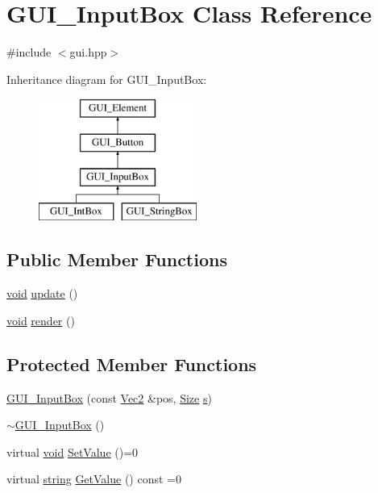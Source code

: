 \hypertarget{class_g_u_i___input_box}{\section{G\-U\-I\-\_\-\-Input\-Box Class Reference}
\label{class_g_u_i___input_box}
}


{\ttfamily \#include $<$gui.\-hpp$>$}

Inheritance diagram for G\-U\-I\-\_\-\-Input\-Box\-:\begin{figure}[H]
\begin{center}
\leavevmode
\includegraphics[height=4.000000cm]{class_g_u_i___input_box}
\end{center}
\end{figure}
\subsection*{Public Member Functions}
\begin{DoxyCompactItemize}
\item 
\hyperlink{_s_d_l__opengles2__gl2ext_8h_ae5d8fa23ad07c48bb609509eae494c95}{void} \hyperlink{class_g_u_i___input_box_a746bc2202307104665d4ab30ad995a7b}{update} ()
\item 
\hyperlink{_s_d_l__opengles2__gl2ext_8h_ae5d8fa23ad07c48bb609509eae494c95}{void} \hyperlink{class_g_u_i___input_box_ab3f53d45c9e3e7096d2db952483eae87}{render} ()
\end{DoxyCompactItemize}
\subsection*{Protected Member Functions}
\begin{DoxyCompactItemize}
\item 
\hyperlink{class_g_u_i___input_box_ac48716009d4e31142e82e86b6675755a}{G\-U\-I\-\_\-\-Input\-Box} (const \hyperlink{class_vec2}{Vec2} \&pos, \hyperlink{gui_8hpp_a1c40db1d9b56c27240e420765695f1c4}{Size} \hyperlink{_s_d_l__opengl_8h_a4af680a6c683f88ed67b76f207f2e6e4}{s})
\item 
\hyperlink{class_g_u_i___input_box_a79ed8e45d1569fd48b2c680232c92235}{$\sim$\-G\-U\-I\-\_\-\-Input\-Box} ()
\item 
virtual \hyperlink{_s_d_l__opengles2__gl2ext_8h_ae5d8fa23ad07c48bb609509eae494c95}{void} \hyperlink{class_g_u_i___input_box_a63a61023be84d38e03c349b260f42300}{Set\-Value} ()=0
\item 
virtual \hyperlink{_s_d_l__opengl__glext_8h_ae84541b4f3d8e1ea24ec0f466a8c568b}{string} \hyperlink{class_g_u_i___input_box_adeb1d006ee9b07917619e734266247fa}{Get\-Value} () const =0
\end{DoxyCompactItemize}
